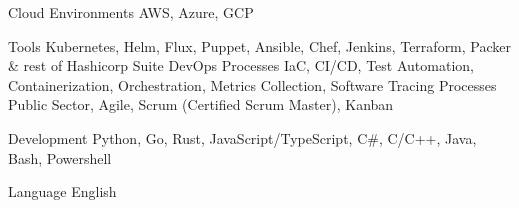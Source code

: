 

\begin{cvskills}

	\cvskill
	{Cloud Environments}
	{AWS, Azure, GCP}

	\cvskill
	{Tools}
	{Kubernetes, Helm, Flux, Puppet, Ansible, Chef, Jenkins, Terraform, Packer \& rest of Hashicorp Suite}
	\cvskill
	{DevOps Processes}
	{IaC, CI/CD, Test Automation, Containerization, Orchestration, Metrics Collection, Software Tracing}
	\cvskill
	{Processes} %
	{Public Sector, Agile, Scrum (Certified Scrum Master), Kanban} %

	\cvskill
	{Development} %
	{Python, Go, Rust, JavaScript/TypeScript, C\#, C/C++, Java, Bash, Powershell} %

	\cvskill
	{Language} %
	{English} %

\end{cvskills}
